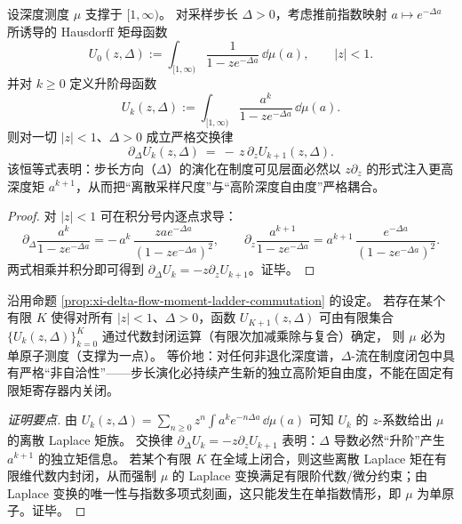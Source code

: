 \begin{proposition}\label{prop:xi-delta-flow-moment-ladder-commutation}
设深度测度 \(\mu\) 支撑于 \([1,\infty)\)。
对采样步长 \(\Delta>0\)，考虑推前指数映射 \(a\mapsto e^{-\Delta a}\) 所诱导的 Hausdorff 矩母函数
\[
U_0(z,\Delta):=\int_{[1,\infty)}\frac{1}{1-ze^{-\Delta a}}\,\dd\mu(a),\qquad |z|<1.
\]
并对 \(k\ge 0\) 定义升阶母函数
\[
U_k(z,\Delta):=\int_{[1,\infty)}\frac{a^k}{1-ze^{-\Delta a}}\,\dd\mu(a).
\]
则对一切 \(|z|<1\)、\(\Delta>0\) 成立严格交换律
\[
\boxed{\;
\partial_\Delta U_k(z,\Delta)\ =\ -\,z\,\partial_z U_{k+1}(z,\Delta).\;}
\]
该恒等式表明：步长方向（\(\Delta\)）的演化在制度可见层面必然以 \(z\partial_z\) 的形式注入更高深度矩 \(a^{k+1}\)，从而把“离散采样尺度”与“高阶深度自由度”严格耦合。
\end{proposition}
\begin{proof}
对 \(|z|<1\) 可在积分号内逐点求导：
\[
\partial_\Delta\frac{a^k}{1-ze^{-\Delta a}}
=-\,a^k\,\frac{zae^{-\Delta a}}{(1-ze^{-\Delta a})^2},
\qquad
\partial_z\frac{a^{k+1}}{1-ze^{-\Delta a}}
=a^{k+1}\,\frac{e^{-\Delta a}}{(1-ze^{-\Delta a})^2}.
\]
两式相乘并积分即可得到 \(\partial_\Delta U_k=-z\partial_z U_{k+1}\)。证毕。
\end{proof}

\begin{proposition}\label{prop:xi-delta-flow-nonclosure}
沿用命题 \ref{prop:xi-delta-flow-moment-ladder-commutation} 的设定。
若存在某个有限 \(K\) 使得对所有 \(|z|<1\)、\(\Delta>0\)，函数 \(U_{K+1}(z,\Delta)\) 可由有限集合 \(\{U_k(z,\Delta)\}_{k=0}^{K}\) 通过代数封闭运算（有限次加减乘除与复合）确定，
则 \(\mu\) 必为单原子测度（支撑为一点）。
等价地：对任何非退化深度谱，\(\Delta\)-流在制度闭包中具有严格“非自洽性”——步长演化必持续产生新的独立高阶矩自由度，不能在固定有限矩寄存器内关闭。
\end{proposition}
\begin{proof}[证明要点]
由
\(
U_k(z,\Delta)=\sum_{n\ge 0}z^n\int a^k e^{-n\Delta a}\,\dd\mu(a)
\)
可知 \(U_k\) 的 \(z\)-系数给出 \(\mu\) 的离散 Laplace 矩族。
交换律 \(\partial_\Delta U_k=-z\partial_z U_{k+1}\) 表明：\(\Delta\) 导数必然“升阶”产生 \(a^{k+1}\) 的独立矩信息。
若某个有限 \(K\) 在全域上闭合，则这些离散 Laplace 矩在有限维代数内封闭，从而强制 \(\mu\) 的 Laplace 变换满足有限阶代数/微分约束；由 Laplace 变换的唯一性与指数多项式刻画，这只能发生在单指数情形，即 \(\mu\) 为单原子。证毕。
\end{proof}

